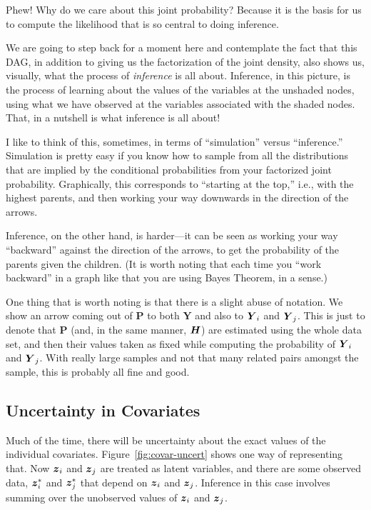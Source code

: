 \documentclass[11pt, oneside]{article}   	%
\def\bm#1{\mathpalette\bmstyle{#1}}
\def\bmstyle#1#2{\mbox{\boldmath$#1#2$}}
\newcommand{\bH}{\bm{H}}
\newcommand{\bY}{\bm{Y}}
\newcommand{\bz}{\bm{z}}
\newcommand{\BY}{\mathbf{Y}}
\newcommand{\BP}{\mathbf{P}}
\begin{document}
Phew! Why do we care about this joint probability? Because it is the basis for us to compute the likelihood that is
so central to doing inference.

We are going to step back for a moment here and contemplate the fact that this DAG, in addition to giving us the
factorization of the joint density, also shows us, visually, what the process of {\em inference} is all about.
Inference, in this picture, is the process of learning about the values of the variables at the unshaded nodes, using
what we have observed at the variables associated with the shaded nodes.  That, in a nutshell is what inference
is all about!

I like to think of this, sometimes, in terms of ``simulation'' versus ``inference.''  Simulation is pretty easy if you know how to sample
from all the distributions that are implied by the conditional probabilities from your factorized joint probability.  Graphically,
this corresponds to ``starting at the top,'' i.e., with the highest parents, and then working your way downwards in the direction
of the arrows.  

Inference, on the other hand, is harder---it can be seen as working your way ``backward'' against the direction of the arrows,
to get the probability of the parents given the children.
(It is worth noting that each time you ``work backward'' in a graph like that you are using Bayes Theorem, in a sense.)

One thing that is worth noting is that there is a slight abuse of notation.  We show an arrow coming out of $\BP$ to both $\BY$ and
also to $\bY_i$ and $\bY_j$.  This is just to denote that $\BP$ (and, in the same manner, $\bH$) are estimated using the whole
data set, and then their values taken as fixed while computing the probability of $\bY_i$ and $\bY_j$.  With really large samples
and not that many related pairs amongst the sample, this is probably all fine and good.


\subsection{Uncertainty in Covariates}

Much of the time, there will be uncertainty about the exact values of the individual covariates.  Figure~\ref{fig:covar-uncert}
shows one way of representing that.  Now $\bz_i$ and $\bz_j$ are treated as latent variables, and there are some observed data,
$\bz_i^*$ and $\bz_j^*$ that depend on $\bz_i$ and $\bz_j$.  Inference in this case involves summing over the unobserved
values of $\bz_i$ and $\bz_j$.
\end{document}
